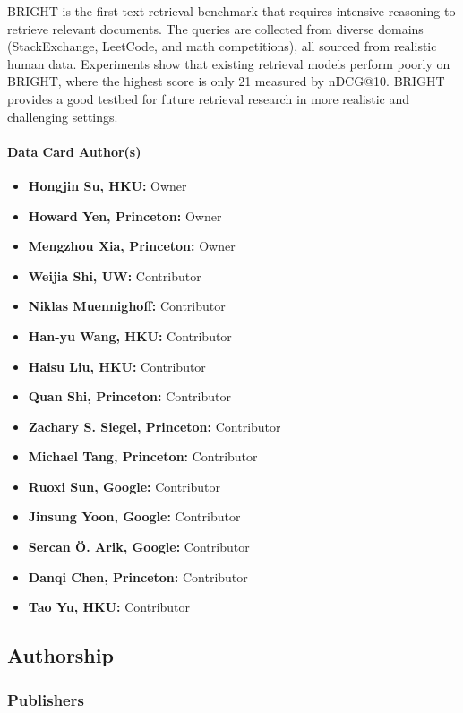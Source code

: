 BRIGHT is the first text retrieval benchmark that requires intensive reasoning to retrieve relevant documents. The queries are collected from diverse domains (StackExchange, LeetCode, and math competitions), all sourced from realistic human data. Experiments show that existing retrieval models perform poorly on BRIGHT, where the highest score is only 21 measured by nDCG@10. BRIGHT provides a good testbed for future retrieval research in more realistic and challenging settings.

\paragraph{Data Card Author(s)}
\begin{itemize}
    \item \textbf{Hongjin Su, HKU:} Owner
    \item \textbf{Howard Yen, Princeton:} Owner
    \item \textbf{Mengzhou Xia, Princeton:} Owner
    \item \textbf{Weijia Shi, UW:} Contributor
    \item \textbf{Niklas Muennighoff:} Contributor
    \item \textbf{Han-yu Wang, HKU:} Contributor
    \item \textbf{Haisu Liu, HKU:} Contributor
    \item \textbf{Quan Shi, Princeton:} Contributor
    \item \textbf{Zachary S. Siegel, Princeton:} Contributor
    \item \textbf{Michael Tang, Princeton:} Contributor
    \item \textbf{Ruoxi Sun, Google:} Contributor
    \item \textbf{Jinsung Yoon, Google:} Contributor
    \item \textbf{Sercan Ö. Arik, Google:} Contributor
    \item \textbf{Danqi Chen, Princeton:} Contributor
    \item \textbf{Tao Yu, HKU:} Contributor
\end{itemize}

\subsection{Authorship}

\subsubsection{Publishers}

